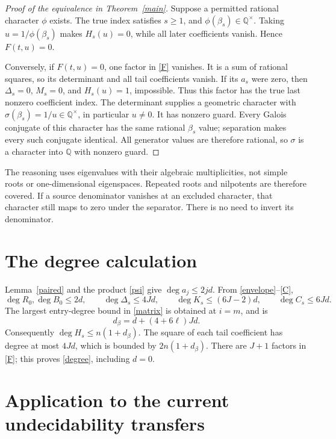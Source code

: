 \documentclass[11pt]{article}
\newcommand{\Q}{\mathbb Q}\newcommand{\Z}{\mathbb Z}
\begin{document}
\begin{proof}[Proof of the equivalence in Theorem~\ref{main}]
Suppose a permitted rational character \(\phi\) exists. The true
index satisfies \(s\ge1\), and \(\phi(\beta_s)\in\Q^\times\).
Taking \(u=1/\phi(\beta_s)\) makes \(H_s(u)=0\), while all later
coefficients vanish. Hence \(F(t,u)=0\).

Conversely, if \(F(t,u)=0\), one factor in \eqref{F} vanishes.
It is a sum of rational squares, so its determinant and all tail
coefficients vanish. If its \(a_s\) were zero, then
\(\Delta_s=0\), \(M_s=0\), and \(H_s(u)=1\), impossible.
Thus this factor has the true last nonzero coefficient index.
The determinant supplies a geometric character with
\(\sigma(\beta_s)=1/u\in\Q^\times\), in particular \(u\ne0\).
It has nonzero guard. Every Galois conjugate of this character has
the same rational \(\beta_s\) value; separation makes every such
conjugate identical. All generator values are therefore rational,
so \(\sigma\) is a character into \(\Q\) with nonzero guard.
\end{proof}

The reasoning uses eigenvalues with their algebraic multiplicities,
not simple roots or one-dimensional eigenspaces. Repeated roots and
nilpotents are therefore covered. If a source denominator vanishes
at an excluded character, that character still maps to zero under
the separator. There is no need to invert its denominator.

\section{The degree calculation}

Lemma~\ref{paired} and the product \eqref{psi} give
\(\deg a_j\le2jd\). From \eqref{envelope}--\eqref{C},
\[
 \deg R_0,\deg B_0\le2d,\qquad
 \deg\Delta_s\le4Jd,\qquad
 \deg K_s\le(6J-2)d,\qquad
 \deg C_s\le6Jd.
\]
The largest entry-degree bound in \eqref{matrix} is obtained at
\(i=m\), and is
\[
                    d_\beta=d+(4+6\ell)Jd.
\]
Consequently \(\deg H_s\le n(1+d_\beta)\). The square of each
tail coefficient has degree at most \(4Jd\), which is bounded by
\(2n(1+d_\beta)\). There are \(J+1\) factors in \eqref{F};
this proves \eqref{degree}, including \(d=0\).

\section{Application to the current undecidability transfers}
\end{document}
